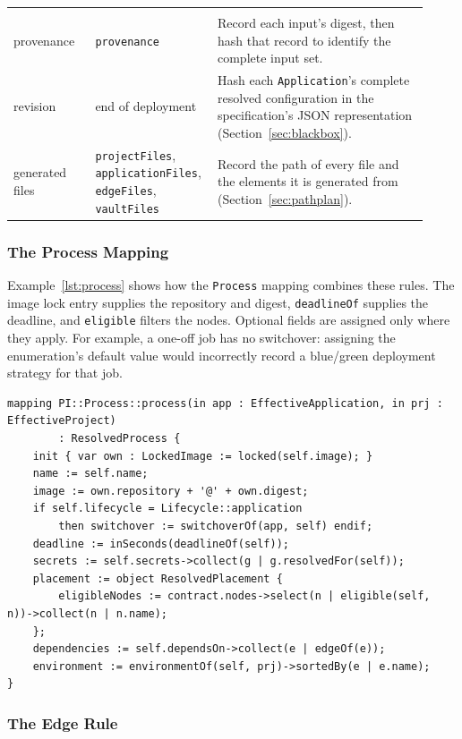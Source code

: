 \begin{longtable}{>{\raggedright\arraybackslash}p{0.19\linewidth}>{\raggedright\arraybackslash}p{0.24\linewidth}>{\raggedright\arraybackslash}p{0.49\linewidth}}
\multicolumn{3}{l}{\emph{Deployment}} \\
provenance & \texttt{provenance} & Record each input's digest, then hash that record to identify the complete input set. \\
revision & end of deployment & Hash each \texttt{Application}'s complete resolved configuration in the specification's JSON representation (Section~\ref{sec:blackbox}). \\
generated files & \texttt{projectFiles}, \texttt{applicationFiles}, \texttt{edgeFiles}, \texttt{vaultFiles} & Record the path of every file and the elements it is generated from (Section~\ref{sec:pathplan}). \\
\end{longtable}

\subsubsection{The Process Mapping}
\label{sec:processrule}

Example~\ref{lst:process} shows how the \texttt{Process} mapping combines
these rules. The image lock entry supplies the repository and digest,
\texttt{deadlineOf} supplies the deadline, and \texttt{eligible} filters the
nodes. Optional fields are assigned only where they apply. For example, a
one-off job has no switchover: assigning the enumeration's default value
would incorrectly record a blue/green deployment strategy for that job.

\begin{lstlisting}[language=qvto, style=report, caption={The Process Mapping, Abridged}, label={lst:process}]
mapping PI::Process::process(in app : EffectiveApplication, in prj : EffectiveProject)
		: ResolvedProcess {
	init { var own : LockedImage := locked(self.image); }
	name := self.name;
	image := own.repository + '@' + own.digest;
	if self.lifecycle = Lifecycle::application
		then switchover := switchoverOf(app, self) endif;
	deadline := inSeconds(deadlineOf(self));
	secrets := self.secrets->collect(g | g.resolvedFor(self));
	placement := object ResolvedPlacement {
		eligibleNodes := contract.nodes->select(n | eligible(self, n))->collect(n | n.name);
	};
	dependencies := self.dependsOn->collect(e | edgeOf(e));
	environment := environmentOf(self, prj)->sortedBy(e | e.name);
}
\end{lstlisting}

\subsubsection{The Edge Rule}
\label{sec:edgerule}

